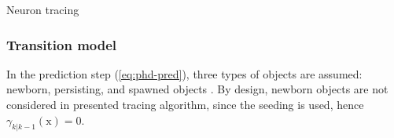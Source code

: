 \begin{algorithm}
	\caption{Neuron tracing}\label{alg:delin}
	\begin{algorithmic}[1]
		\Repeat
		 \label{alg:line:draw-obs-particles} 
		 \label{alg:line:construct-obs} 
		 
	\end{algorithmic}
\end{algorithm}
\subsubsection{Transition model}
\label{sssec:prediction-model}
In the prediction step (\ref{eq:phd-pred}), three types of objects are assumed: newborn, persisting, and spawned objects \cite{vo2005sequential,vo2006gaussian}. By design, newborn objects are not considered in presented tracing algorithm, since the seeding is used, hence $\gamma_{k|k-1}(\mathrm{x})=0$.

